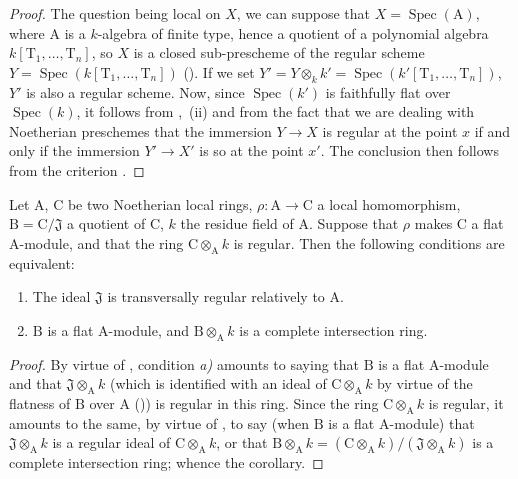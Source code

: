 \begin{proof}
The question being local on $X$, we can suppose that $X=\operatorname{Spec}(\mathrm{A})$, where $\mathrm{A}$ is a $k$-algebra of finite type, hence a quotient of a polynomial algebra $k[\mathrm{T}_1,\ldots,\mathrm{T}_n]$, so $X$ is a closed sub-prescheme of the regular scheme $Y=\operatorname{Spec}(k[\mathrm{T}_1,\ldots,\mathrm{T}_n])$ ().
If we set $Y'=Y\otimes_k k'=\operatorname{Spec}(k'[\mathrm{T}_1,\ldots,\mathrm{T}_n])$, $Y'$ is also a regular scheme.
Now, since $\operatorname{Spec}(k')$ is faithfully flat over $\operatorname{Spec}(k)$, it follows from ,~(ii) and from the fact that we are dealing with Noetherian preschemes that the immersion $Y\to X$ is regular at the point $x$ if and only if the immersion $Y'\to X'$ is so at the point $x'$.
The conclusion then follows from the criterion .
\end{proof}

\begin{corollary}[19.3.5]
\label{IV.19.3.5}
Let $\mathrm{A}$, $\mathrm{C}$ be two Noetherian local rings, $\rho:\mathrm{A}\to\mathrm{C}$ a local homomorphism, $\mathrm{B}=\mathrm{C}/\mathfrak{J}$ a quotient of $\mathrm{C}$, $k$ the residue field of $\mathrm{A}$.
Suppose that $\rho$ makes $\mathrm{C}$ a flat $\mathrm{A}$-module, and that the ring $\mathrm{C}\otimes_{\mathrm{A}} k$ is regular.
Then the following conditions are equivalent:
\begin{enumerate}[label=\emph{\alph*)}]
  \item The ideal $\mathfrak{J}$ is transversally regular relatively to $\mathrm{A}$.
  \item $\mathrm{B}$ is a flat $\mathrm{A}$-module, and $\mathrm{B}\otimes_{\mathrm{A}} k$ is a complete intersection ring.
\end{enumerate}
\end{corollary}

\begin{proof}
By virtue of , condition \emph{a)} amounts to saying that $\mathrm{B}$ is a flat $\mathrm{A}$-module and that $\mathfrak{J}\otimes_{\mathrm{A}} k$ (which is identified with an ideal of $\mathrm{C}\otimes_{\mathrm{A}} k$ by virtue of the flatness of $\mathrm{B}$ over $\mathrm{A}$ ()) is regular in this ring.
Since the ring $\mathrm{C}\otimes_{\mathrm{A}} k$ is regular, it amounts to the same, by virtue of , to say (when $\mathrm{B}$ is a flat $\mathrm{A}$-module) that $\mathfrak{J}\otimes_{\mathrm{A}} k$ is a regular ideal of $\mathrm{C}\otimes_{\mathrm{A}} k$, or that $\mathrm{B}\otimes_{\mathrm{A}} k=(\mathrm{C}\otimes_{\mathrm{A}} k)/(\mathfrak{J}\otimes_{\mathrm{A}} k)$ is a complete intersection ring; whence the corollary.
\end{proof}

